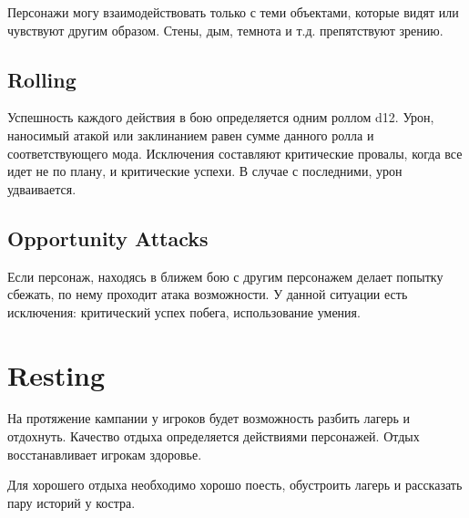 \documentclass[a5paper,11pt]{book}
\begin{document}
\begin{multicols}{2}
Персонажи могу взаимодействовать только с теми объектами, которые видят или чувствуют другим образом. Стены, дым, темнота и т.д. препятствуют зрению.

\subsection{Rolling}

Успешность каждого действия в бою определяется одним роллом d12. Урон, наносимый атакой или заклинанием равен сумме данного ролла и соответствующего мода. Исключения составляют критические провалы, когда все идет не по плану, и критические успехи. В случае с последними, урон удваивается.

\subsection{Opportunity Attacks}

Если персонаж, находясь в ближем бою с другим персонажем делает попытку сбежать, по нему проходит атака возможности. У данной ситуации есть исключения: критический успех побега, использование умения.


\section{Resting}

На протяжение кампании у игроков будет возможность разбить лагерь и отдохнуть. Качество отдыха определяется действиями персонажей. Отдых восстанавливает игрокам здоровье.

Для хорошего отдыха необходимо хорошо поесть, обустроить лагерь и рассказать пару историй у костра.


\end{multicols}
\end{document}
